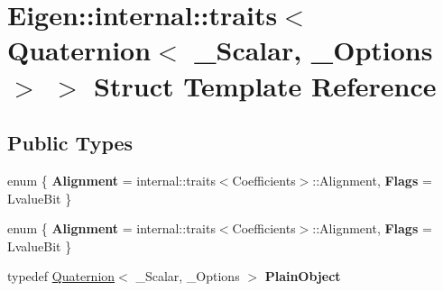 \hypertarget{struct_eigen_1_1internal_1_1traits_3_01_quaternion_3_01___scalar_00_01___options_01_4_01_4}{}\section{Eigen\+:\+:internal\+:\+:traits$<$ Quaternion$<$ \+\_\+\+Scalar, \+\_\+\+Options $>$ $>$ Struct Template Reference}
\label{struct_eigen_1_1internal_1_1traits_3_01_quaternion_3_01___scalar_00_01___options_01_4_01_4}
\subsection*{Public Types}
\begin{DoxyCompactItemize}
\item 
\mbox{\label{struct_eigen_1_1internal_1_1traits_3_01_quaternion_3_01___scalar_00_01___options_01_4_01_4_a9c211d09ad0d17b3de1e896f3e415af1}} 
enum \{ {\bfseries Alignment} = internal\+:\+:traits$<$Coefficients$>$\+:\+:Alignment, 
{\bfseries Flags} = Lvalue\+Bit
 \}
\item 
\mbox{\label{struct_eigen_1_1internal_1_1traits_3_01_quaternion_3_01___scalar_00_01___options_01_4_01_4_ac242c4b2f1502d04a91ad8699e69d2e0}} 
enum \{ {\bfseries Alignment} = internal\+:\+:traits$<$Coefficients$>$\+:\+:Alignment, 
{\bfseries Flags} = Lvalue\+Bit
 \}
\item 
\mbox{\label{struct_eigen_1_1internal_1_1traits_3_01_quaternion_3_01___scalar_00_01___options_01_4_01_4_aa4df82695cfa29ce9a7e9beab75dc1bf}} 
typedef \hyperlink{group___geometry___module_class_eigen_1_1_quaternion}{Quaternion}$<$ \+\_\+\+Scalar, \+\_\+\+Options $>$ {\bfseries Plain\+Object}
\item 
\mbox{\label{struct_eigen_1_1internal_1_1traits_3_01_quaternion_3_01___scalar_00_01___options_01_4_01_4_ae08389cd2248d4a2c189cdf99f912b41}} 

\end{DoxyCompactItemize}
